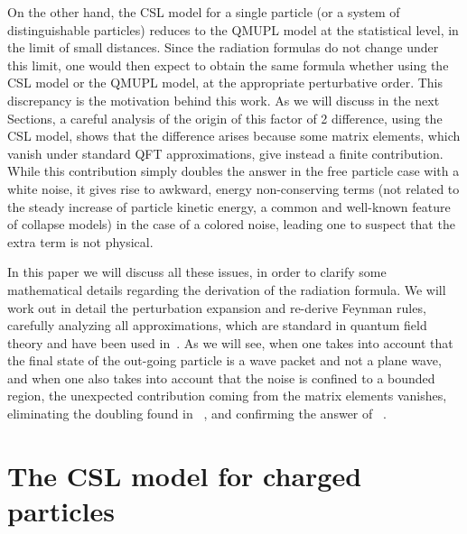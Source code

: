 \documentclass[12pt,onecolumn,amssymb,nofootinbib]{revtex4-2} %
\begin{document}
On the other hand, the CSL model for a single particle (or a system of distinguishable particles) reduces to the QMUPL model at the statistical level, in the limit of small distances. Since the radiation formulas do not change under this limit, one would then expect to obtain the same formula whether using the CSL model or the QMUPL model, at the appropriate perturbative order. This discrepancy is the motivation behind this work. As we will discuss in the next Sections, a careful analysis of the origin of this factor of 2 difference, using the CSL model, shows that the difference arises because some matrix elements, which vanish under standard QFT approximations, give instead a finite contribution. While this contribution simply doubles the answer in the free particle case with a white noise, it gives rise to awkward, energy non-conserving terms (not related to the steady increase of particle kinetic energy, a common and well-known feature of collapse models) in the case of a colored noise, leading one to suspect that the extra term is not physical.

In this paper we will discuss all these issues, in order to clarify some mathematical details regarding the derivation of the radiation formula. We will work out in detail the perturbation expansion and re-derive Feynman rules, carefully analyzing all approximations, which are standard in quantum field theory and have been used in~\cite{ref:fu,ref:ar}. As we will see, when one takes into account that the final state of the out-going particle is a wave packet and not a plane wave, and when one also takes into account that the noise is confined to a bounded region, the unexpected contribution coming from the matrix elements  vanishes, eliminating the doubling found in ~\cite{ref:bd}, and confirming the answer of ~\cite{ref:fu,ref:ar}.

\section{The CSL model for charged particles}
\end{document}

